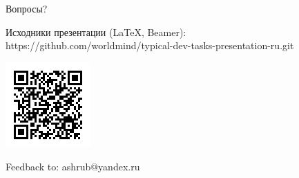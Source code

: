 \documentclass[aspectratio=169]{beamer}
\begin{document}
\begin{frame}{Вопросы?}
\begin{block}{Исходники презентации (LaTeX, Beamer):}
https://github.com/worldmind/typical-dev-tasks-presentation-ru.git
\begin{center}
\includegraphics{qr-git-url.png}
\end{center}
\end{block}
\begin{block}{Feedback to: ashrub@yandex.ru}
\end{block}

\end{frame}
\end{document}
